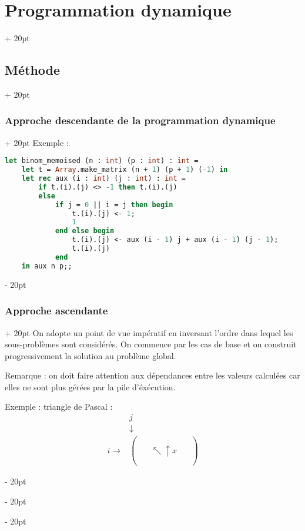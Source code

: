 \documentclass[a4paper, 12pt, twoside]{article}
\newcommand{\ind}[1][20pt]{\advance\leftskip + #1}
\newcommand{\deind}[1][20pt]{\advance\leftskip - #1}
\newenvironment{indt}[2][20pt]{#2 \par \ind[#1]}{\par \deind} %
\begin{document}
\begin{indt}{\section{Programmation dynamique}}
\begin{indt}{\subsection{Méthode}}
\begin{indt}{\subsubsection{Approche descendante de la programmation dynamique}}
                Exemple :
                
                \newpage
                
                \begin{lstlisting}[language=Caml, xleftmargin=80pt]
let binom_memoised (n : int) (p : int) : int =
    let t = Array.make_matrix (n + 1) (p + 1) (-1) in
    let rec aux (i : int) (j : int) : int =
        if t.(i).(j) <> -1 then t.(i).(j)
        else
            if j = 0 || i = j then begin
                t.(i).(j) <- 1;
                1
            end else begin
                t.(i).(j) <- aux (i - 1) j + aux (i - 1) (j - 1);
                t.(i).(j)
            end
    in aux n p;;\end{lstlisting}
            \end{indt}
            
            \vspace{12pt}
            
            \begin{indt}{\subsubsection{Approche ascendante}}
                On adopte un point de vue impératif en inversant l'ordre dans lequel les sous-problèmes sont considérés. On commence par les cas de base et on construit progressivement la solution au problème global.
                
                \vspace{12pt}
                
                Remarque : on doit faire attention aux dépendances entre les valeurs calculées car elles ne sont plus gérées par la pile d'éxécution.
                
                Exemple : triangle de Pascal :
                    \[
                        \begin{array}{cc}
                            & j
                            \\
                            & \downarrow
                            \\
                            i \rightarrow
                            &
                            \begin{pmatrix} 
                                \phantom a & \phantom a & \phantom a
                                \\
                                \phantom a & \nwarrow \!\! \uparrow \!\!\!\!\!\! x & \phantom a
                                \\
                                \phantom a & \phantom a & \phantom a
                            \end{pmatrix}
                        \end{array}
                    \]
                

\end{indt}
\end{indt}
\end{indt}
\end{document}
